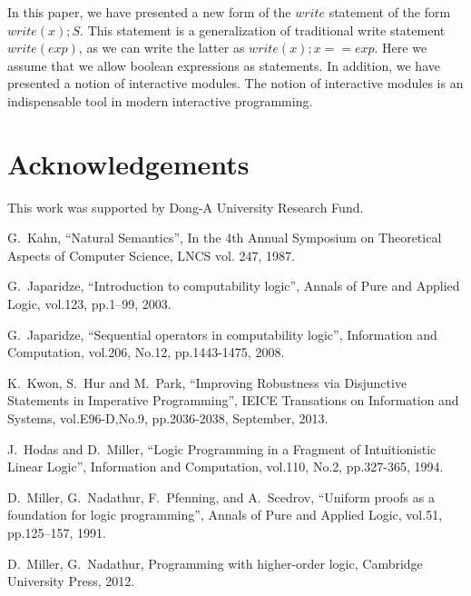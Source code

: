 \documentclass[12pt]{article}
\begin{document}
In this paper, we have presented a new form of the $write$ statement of the form $write(x);S$.
This statement is a generalization of traditional write statement 
$write(exp)$, as we can write the latter as $write(x); x == exp$. Here we assume that
 we allow boolean expressions as statements.
In addition, we have presented a notion of  interactive
 modules.  The notion of interactive modules is an indispensable tool in
modern interactive programming.

\section{Acknowledgements}

This work  was supported by Dong-A University Research Fund.


\begin{thebibliography}{1}

G.~Kahn,  ``Natural Semantics'', In the 4th Annual Symposium on Theoretical Aspects of Computer Science, 
LNCS vol. 247,  1987.



G.~Japaridze, ``Introduction to computability logic'', Annals  of Pure and
 Applied  Logic, vol.123, pp.1--99, 2003.

G.~Japaridze,   ``Sequential operators in computability logic'',
 Information and Computation, vol.206, No.12, pp.1443-1475, 2008.  

K.~Kwon, S.~Hur and M.~Park,  ``Improving Robustness via Disjunctive Statements in Imperative  Programming'', IEICE Transations on Information and Systems, vol.E96-D,No.9, pp.2036-2038, September, 2013.  

J.~Hodas and D.~Miller,   ``Logic Programming in a Fragment of Intuitionistic Linear Logic'', 
 Information and Computation, vol.110, No.2, pp.327-365, 1994. 



D.~Miller, G.~Nadathur, F.~Pfenning, and A.~Scedrov, ``Uniform proofs as a
  foundation for logic programming'', Annals of Pure and Applied Logic, vol.51,
  pp.125--157, 1991.

D.~Miller, G.~Nadathur, Programming with higher-order logic, Cambridge University Press,   2012.
\end{thebibliography}
\end{document}
